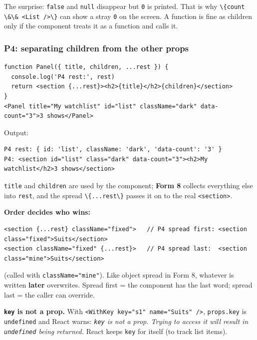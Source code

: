 \documentclass[
  10pt,
]{article}
\newcommand{\passthrough}[1]{#1}
\begin{document}
The surprise: \passthrough{\lstinline!false!} and
\passthrough{\lstinline!null!} disappear but \passthrough{\lstinline!0!}
is printed. That is why
\passthrough{\lstinline!\{count \&\& <List />\}!} can show a stray
\passthrough{\lstinline!0!} on the screen. A function is fine as
children only if the component treats it as a function and calls it.

\hypertarget{p4-separating-children-from-the-other-props}{%
\subsubsection{P4: separating children from the other
props}\label{p4-separating-children-from-the-other-props}}

\begin{lstlisting}
function Panel({ title, children, ...rest }) {
  console.log('P4 rest:', rest)
  return <section {...rest}><h2>{title}</h2>{children}</section>
}
<Panel title="My watchlist" id="list" className="dark" data-count="3">3 shows</Panel>
\end{lstlisting}

Output:

\begin{lstlisting}
P4 rest: { id: 'list', className: 'dark', 'data-count': '3' }
P4: <section id="list" class="dark" data-count="3"><h2>My watchlist</h2>3 shows</section>
\end{lstlisting}

\passthrough{\lstinline!title!} and \passthrough{\lstinline!children!}
are used by the component; \textbf{Form 8} collects everything else into
\passthrough{\lstinline!rest!}, and the spread
\passthrough{\lstinline!\{...rest\}!} passes it on to the real
\passthrough{\lstinline!<section>!}.

\textbf{Order decides who wins:}

\begin{lstlisting}
<section {...rest} className="fixed">   // P4 spread first: <section class="fixed">Suits</section>
<section className="fixed" {...rest}>   // P4 spread last:  <section class="mine">Suits</section>
\end{lstlisting}

(called with \passthrough{\lstinline!className="mine"!}). Like object
spread in Form 8, whatever is written \textbf{later} overwrites. Spread
first = the component has the last word; spread last = the caller can
override.

\textbf{\passthrough{\lstinline!key!} is not a prop.} With
\passthrough{\lstinline!<WithKey key="s1" name="Suits" />!},
\passthrough{\lstinline!props.key!} is
\passthrough{\lstinline!undefined!} and React warns:
\emph{\passthrough{\lstinline!key!} is not a prop. Trying to access it
will result in \passthrough{\lstinline!undefined!} being returned.}
React keeps \passthrough{\lstinline!key!} for itself (to track list
items).
\end{document}
